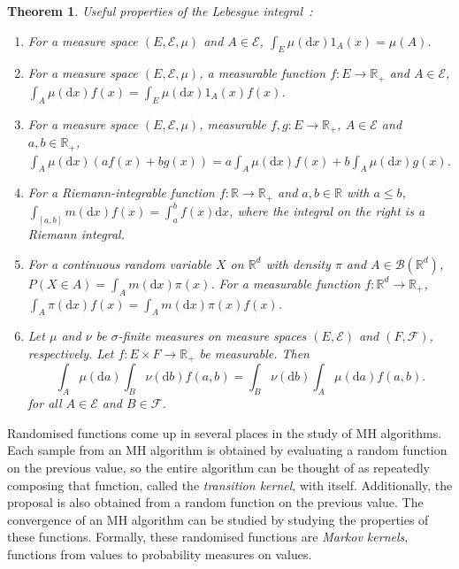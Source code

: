 \documentclass[english,twoside,openright]{HYgraduMLDS}
\newtheorem{theorem}[lemma]{Theorem}
\newcommand{\R}{\mathbb{R}}
\newcommand{\dx}{\mathrm{d}}
\begin{document}
\begin{theorem}\label{lebesgue_integral_theorem}
  Useful properties of the Lebesgue integral~\cite{Cin11}:
	\begin{enumerate}
    \item For a measure space \((E, \mathcal{E}, \mu)\) and
          \(A\in \mathcal{E}\), \(\int_{E}\mu(\dx x)1_{A}(x) = \mu(A)\).
    \item For a measure space \((E, \mathcal{E}, \mu)\),
          a measurable function \(f\colon E\to\R_{+}\) and \(A\in \mathcal{E}\),
          \(\int_{A}\mu(\dx x)f(x) = \int_{E}\mu(\dx x)1_{A}(x)f(x)\).
    \item For a measure space \((E, \mathcal{E}, \mu)\), measurable
          \(f, g\colon E\to \R_{+}\), \(A\in \mathcal{E}\) and \(a, b\in \R_{+}\),
          \(\int_{A} \mu(\dx x)(af(x) + bg(x))
          = a\int_{A} \mu(\dx x) f(x) + b\int_{A} \mu(\dx x) g(x)\).
    \item For a Riemann-integrable function \(f\colon \R\to \R_{+}\) and
          \(a, b\in \R\) with \(a \leq b\),
          \(\int_{[a, b]}m(\dx x)f(x) = \int_{a}^{b}f(x)\dx x\),
          where the integral on the right is a Riemann integral.
    \item For a continuous random variable \(X\) on \(\R^{d}\) with
          density \(\pi\) and \(A\in \mathcal{B}(\R^{d})\),
          \(P(X\in A) = \int_{A}m(\dx x)\pi(x)\). For a measurable
          function \(f\colon \R^{d}\to \R_{+}\),
          \(\int_{A}\pi(\dx x)f(x) = \int_{A}m(\dx x)\pi(x)f(x)\).
    \item Let \(\mu\) and \(\nu\) be \(\sigma\)-finite measures on
          measure spaces \((E, \mathcal{E})\) and \((F, \mathcal{F})\),
          respectively. Let \(f\colon E\times F\to \R_{+}\) be measurable.
          Then
          \[
          \int_{A}\mu(\dx a)\int_{B}\nu(\dx b)f(a, b)
          = \int_{B}\nu(\dx b)\int_{A}\mu(\dx a)f(a, b).
          \]
          for all \(A\in \mathcal{E}\) and \(B\in \mathcal{F}\).
  \end{enumerate}
\end{theorem}

Randomised functions come up in several places in the study of MH algorithms.
Each sample from an MH algorithm is obtained by evaluating a random function
on the previous value, so the entire algorithm can be thought of as repeatedly
composing that function, called the \emph{transition kernel}, with itself.
Additionally, the proposal is also obtained
from a random function on the previous value. The convergence of an MH
algorithm can be studied by studying the properties of these functions.
Formally, these randomised functions are \emph{Markov kernels},
functions from values to probability measures on values.
\end{document}

